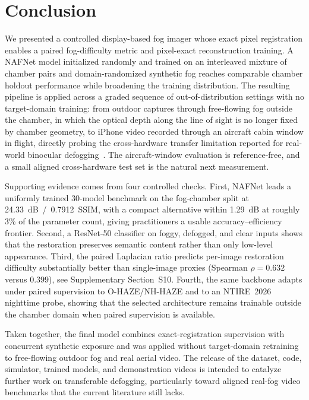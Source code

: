 \documentclass{optica-article}
\begin{document}
\section{Conclusion}
\label{sec:conclusion}

We presented a controlled display-based fog imager whose exact pixel
registration enables a paired fog-difficulty metric and pixel-exact
reconstruction training. A NAFNet model initialized randomly and trained
on an interleaved mixture of chamber pairs and domain-randomized
synthetic fog reaches comparable chamber holdout performance while
broadening the training distribution. The resulting pipeline is
applied across a
graded sequence of out-of-distribution
settings with no target-domain training: from outdoor captures through
free-flowing fog outside the chamber, in which the optical depth along the
line of sight is no longer fixed by chamber geometry, to iPhone video
recorded through an aircraft cabin window in flight, directly
probing the cross-hardware transfer limitation reported for
real-world binocular defogging~\cite{pollak2024stereofog}. The
aircraft-window evaluation is reference-free, and a small aligned
cross-hardware test set is the natural next measurement.

Supporting evidence comes from four controlled checks. First, NAFNet
leads a uniformly trained 30-model benchmark on the fog-chamber split
at 24.33~dB~/~0.7912~SSIM, with a compact alternative within 1.29~dB
at roughly 3\% of the parameter count, giving practitioners a usable
accuracy--efficiency frontier. Second, a ResNet-50 classifier on
foggy, defogged, and clear inputs shows that the restoration
preserves semantic content rather than only low-level appearance.
Third, the paired Laplacian ratio predicts per-image restoration
difficulty substantially better than single-image proxies
(Spearman $\rho = 0.632$ versus $0.399$), see Supplementary Section~S10. Fourth, the same backbone adapts under paired supervision to O-HAZE/NH-HAZE and to an NTIRE~2026
nighttime probe, showing that the selected architecture remains
trainable outside the chamber domain when paired supervision is
available.

Taken together, the final model combines exact-registration
supervision with concurrent synthetic exposure and was applied
without target-domain retraining to free-flowing outdoor fog and real
aerial video. The release of the dataset, code,
simulator, trained models, and demonstration videos is intended to catalyze further
work on transferable defogging, particularly toward aligned real-fog
video benchmarks that the current literature still lacks.
\end{document}
